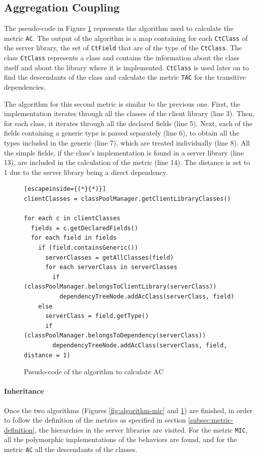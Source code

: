 \subsection{Aggregation Coupling}
The pseudo-code in Figure \ref{fig:algorithm-ac} represents the algorithm used to calculate the metric \texttt{AC}. The output of the algorithm is a map containing for each \texttt{CtClass} of the server library, the set of \texttt{CtField} that are of the type of the \texttt{CtClass}. The class \texttt{CtClass} represents a class and contains the information about the class itself and about the library where it is implemented. \texttt{CtClass} is used later on to find the descendants of the class and calculate the metric \texttt{TAC} for the transitive dependencies.

The algorithm for this second metric is similar to the previous one. First, the implementation iterates through all the classes of the client library (line 3). Then, for each class, it iterates through all the declared fields (line 5). Next, each of the fields containing a generic type is parsed separately (line 6), to obtain all the types included in the generic (line 7), which are treated individually (line 8). All the simple fields, if the class's implementation is found in a server library (line 13), are included in the calculation of the metric (line 14). The distance is set to 1 due to the server library being a direct dependency.

\begin{figure}[ht!]
\begin{lstlisting}[escapeinside={(*}{*)}]
clientClasses = classPoolManager.getClientLibraryClasses()

for each c in clientClasses
  fields = c.getDeclaredFields()
  for each field in fields
    if (field.containsGeneric())
      serverClasses = getAllClasses(field)
      for each serverClass in serverClasses
        if (classPoolManager.belongsToClientLibrary(serverClass))
          dependencyTreeNode.addAcClass(serverClass, field)
    else
      serverClass = field.getType()
      if (classPoolManager.belongsToDependency(serverClass))
        dependencyTreeNode.addAcClass(serverClass, field, distance = 1)
\end{lstlisting}
\caption{Pseudo-code of the algorithm to calculate AC}
\label{fig:algorithm-ac}
\end{figure}

\paragraph{Inheritance}\label{paragraph:inheritance}
Once the two algorithms (Figures \ref{fig:algorithm-mic} and \ref{fig:algorithm-ac}) are finished, in order to follow the definition of the metrics as specified in section \ref{subsec:metric-definition}, the hierarchies in the server libraries are visited. For the metric \texttt{MIC}, all the polymorphic implementations of the behaviors are found, and for the metric \texttt{AC} all the descendants of the classes.

